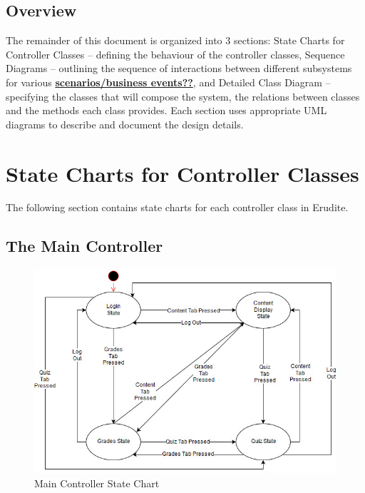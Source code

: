 \documentclass[]{article}
\begin{document}
\subsection{Overview}
\label{sub:overview}
The remainder of this document is organized into 3 sections: State Charts for
Controller Classes -- defining the behaviour of the controller classes,
Sequence Diagrams -- outlining the sequence of interactions between different
subsystems for various \underline{\bf scenarios/business events??}, and
Detailed Class Diagram -- specifying the classes that will compose the system,
the relations between classes and the methods each class provides. Each section
uses appropriate UML diagrams to describe and document the design details.


\section{State Charts for Controller Classes}
\label{sec:state_charts_for_controller_classes}
The following section contains state charts for each controller class in Erudite.

\subsection{The Main Controller}
{
\begin{figure}[H]
  \centering
  \includegraphics[scale=0.5]{A3_Assets/MainController.jpg}
  \caption{Main Controller State Chart}
\end{figure}
}
\end{document}
